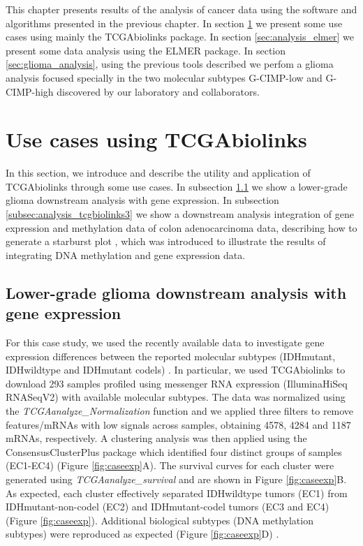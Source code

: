 
This chapter presents results of the analysis of cancer data using the
software and algorithms presented in the previous chapter. In section
\ref{sec:analysis_tcgbiolinks} we present some use cases using mainly the TCGAbiolinks
package. In section \ref{sec:analysis_elmer} we present some data analysis using the ELMER package.
In section \ref{sec:glioma_analysis}, using the previous tools described we perfom a
glioma analysis focused specially in the two molecular subtypes G-CIMP-low and
 G-CIMP-high discovered by our laboratory and collaborators.

\section{Use cases using TCGAbiolinks}\label{sec:analysis_tcgbiolinks}

In this section, we introduce and describe the utility and application of TCGAbiolinks
through some use cases.
In subsection  \ref{subsec:analysis_tcgbiolinks2} we show a
lower-grade glioma downstream analysis with gene expression.
In subsection \ref{subsec:analysis_tcgbiolinks3} we show a
downstream analysis integration of gene expression and methylation data of colon
adenocarcinoma data, describing how to generate a starburst plot \cite{noushmehr2010identification},
which was introduced to illustrate the results of integrating
DNA methylation and gene expression data.


\subsection{Lower-grade glioma downstream analysis with gene expression} \label{subsec:analysis_tcgbiolinks2}

For this case study, we used the recently available  data to investigate gene expression differences between the reported molecular subtypes (IDHmutant, IDHwildtype and IDHmutant codels) \cite{platforms2015comprehensive}. In particular, we used TCGAbiolinks to download 293 samples profiled using messenger RNA expression (IlluminaHiSeq RNASeqV2) with available molecular subtypes. The data was normalized using the \textit{TCGAanalyze\_Normalization} function and we applied three filters to remove features/mRNAs with low signals across samples, obtaining 4578, 4284 and 1187 mRNAs, respectively. A clustering analysis was then applied using the ConsensusClusterPlus package \cite{wilkerson2010consensusclusterplus} which identified four distinct groups of samples (EC1-EC4) (Figure \ref{fig:caseexp}A). The survival curves for each cluster were generated using \textit{TCGAanalyze\_survival} and are shown in Figure \ref{fig:caseexp}B. As expected, each cluster effectively separated IDHwildtype tumors (EC1) from IDHmutant-non-codel (EC2) and IDHmutant-codel tumors (EC3 and EC4) (Figure \ref{fig:caseexp}). Additional biological subtypes (DNA methylation subtypes) were reproduced as expected (Figure \ref{fig:caseexp}D) \cite{platforms2015comprehensive}.

